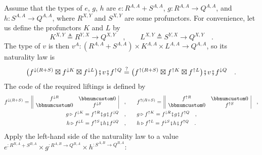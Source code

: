 Assume that the types of $e$, $g$, $h$ are $e:R^{A,A}+S^{A,A}$,
$g:R^{A,A}\rightarrow Q^{A,A}$, and $h:S^{A,A}\rightarrow Q^{A,A}$,
where $R^{X,Y}$ and $S^{X,Y}$ are some profunctors. For convenience,
let us define the profunctors $K$ and $L$ by
\[
K^{X,Y}\triangleq R^{Y,X}\rightarrow Q^{X,Y}\quad,\quad\quad L^{X,Y}\triangleq S^{Y,X}\rightarrow Q^{X,Y}\quad.
\]
The type of $v$ is then $v^{A}:(R^{A,A}+S^{A,A})\times K^{A,A}\times L^{A,A}\rightarrow Q^{A,A}$,
so its naturality law is 
\[
\big(f^{\downarrow(R+S)}\boxtimes f^{\downarrow K}\boxtimes f^{\downarrow L}\big)\bef v\bef f^{\uparrow Q}\overset{?}{=}\big(f^{\uparrow(R+S)}\boxtimes f^{\uparrow K}\boxtimes f^{\uparrow L}\big)\bef v\bef f^{\downarrow Q}\quad.
\]
The code of the required liftings is defined by
\begin{align*}
f^{\downarrow(R+S)}=\,\begin{array}{||cc|}
f^{\downarrow R} & \bbnum 0\\
\bbnum 0 & f^{\downarrow S}
\end{array}\quad, & \quad\quad f^{\uparrow(R+S)}=\,\begin{array}{||cc|}
f^{\uparrow R} & \bbnum 0\\
\bbnum 0 & f^{\uparrow S}
\end{array}\quad,\\
g\triangleright f^{\downarrow K}=f^{\uparrow R}\bef g\bef f^{\downarrow Q}\quad, & \quad\quad g\triangleright f^{\uparrow K}=f^{\downarrow R}\bef g\bef f^{\uparrow Q}\quad,\\
h\triangleright f^{\downarrow L}=f^{\uparrow S}\bef h\bef f^{\downarrow Q}\quad, & \quad\quad h\triangleright f^{\uparrow L}=f^{\downarrow S}\bef h\bef f^{\uparrow Q}\quad.
\end{align*}
Apply the left-hand side of the naturality law to a value $e^{:R^{B,A}+S^{B,A}}\times g^{:R^{A,B}\rightarrow Q^{B,A}}\times h^{:S^{A,B}\rightarrow Q^{B,A}}$:
